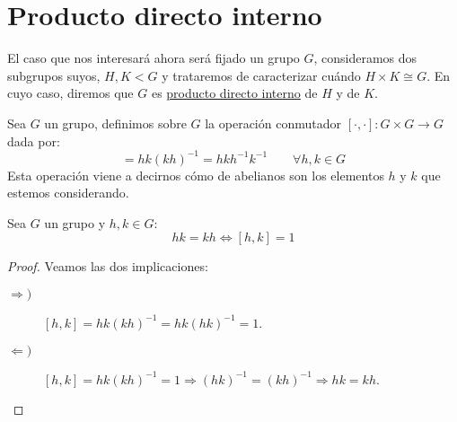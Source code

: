 \section{Producto directo interno}
El caso que nos interesará ahora será fijado un grupo $G$, consideramos dos subgrupos suyos, $H,K<G$ y trataremos de caracterizar cuándo $H\times K \cong G$. En cuyo caso, diremos que $G$ es \underline{producto directo interno} de $H$ y de $K$.

\begin{definicion}[Conmutador]
    Sea $G$ un grupo, definimos sobre $G$ la operación conmutador $[\cdot ,\cdot ]:G\times G \to G$ dada por:
    \begin{equation*}
        [h,k] = hk{(kh)}^{-1} = hkh^{-1}k^{-1}  \qquad \forall h,k\in G
    \end{equation*}
    Esta operación viene a decirnos cómo de abelianos son los elementos $h$ y $k$ que estemos considerando.
\end{definicion}

\begin{prop}
    Sea $G$ un grupo y $h,k\in G$:
    \begin{equation*}
        hk = kh \Longleftrightarrow [h,k] = 1
    \end{equation*}
    \begin{proof}
        Veamos las dos implicaciones:
        \begin{description}
            \item [$\Longrightarrow)$] $[h,k] = hk{(kh)}^{-1} = hk{(hk)}^{-1} = 1$.
            \item [$\Longleftarrow)$] $[h,k] = hk{(kh)}^{-1} = 1 \Longrightarrow {(hk)}^{-1} = {(kh)}^{-1} \Longrightarrow hk = kh$.
        \end{description}
    \end{proof}
\end{prop}

